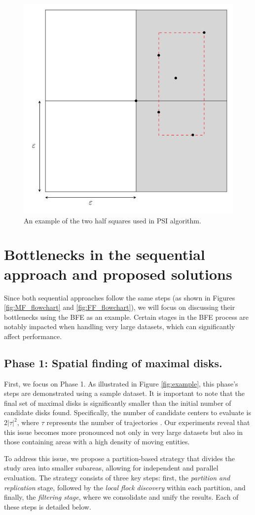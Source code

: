 \begin{figure}
    \centering
    \includegraphics[width=0.5\linewidth]{chapter4/figures/square.pdf}
    \caption{An example of the two half squares used in PSI algorithm.}\label{fig:square}
\end{figure}

\section{Bottlenecks in the sequential approach and proposed solutions} \label{spatial_phase}
Since both sequential approaches follow the same steps (as shown in Figures \ref{fig:MF_flowchart} and \ref{fig:FF_flowchart}), we will focus on discussing their bottlenecks using the BFE as an example. Certain stages in the BFE process are notably impacted when handling very large datasets, which can significantly affect performance.

\subsection{Phase 1: Spatial finding of maximal disks.}
First, we focus on Phase 1. As illustrated in Figure \ref{fig:example}, this phase's steps are demonstrated using a sample dataset. It is important to note that the final set of maximal disks is significantly smaller than the initial number of candidate disks found. Specifically, the number of candidate centers to evaluate is $2\lvert\tau\rvert^2$, where $\tau$ represents the number of trajectories \cite{vieira_2009}. Our experiments reveal that this issue becomes more pronounced not only in very large datasets but also in those containing areas with a high density of moving entities.

To address this issue, we propose a partition-based strategy that divides the study area into smaller subareas, allowing for independent and parallel evaluation. The strategy consists of three key steps: first, the \textit{partition and replication} stage, followed by the \textit{local flock discovery} within each partition, and finally, the \textit{filtering stage}, where we consolidate and unify the results. Each of these steps is detailed below.

